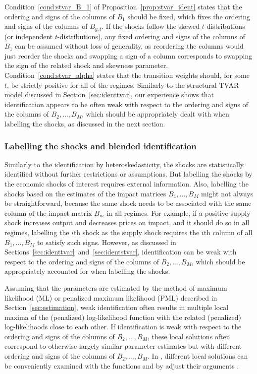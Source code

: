 \documentclass[nojss]{jss}
\begin{document}
Condition~\ref{cond:stvar_B_1} of Proposition~\ref{prop:stvar_ident} states that the ordering and signs of the columns of $B_1$ should be fixed, which fixes the ordering and signs of the columns of $B_{y,t}$. If the shocks follow the skewed $t$-distributions (or independent $t$-distributions), any fixed ordering and signs of the columns of $B_1$ can be assumed without loss of generality, as reordering the columns would just reorder the shocks and swapping a sign of a column corresponds to swapping the sign of the related shock and skewness parameter. Condition~\ref{cond:stvar_alpha} states that the transition weights should, for some $t$, be strictly positive for all of the regimes. Similarly to the structural TVAR model discussed in Section~\ref{sec:identtvar}, our experience shows that identification appears to be often weak with respect to the ordering and signs of the columns of $B_2,...,B_M$, which should be appropriately dealt with when labelling the shocks, as discussed in the next section.

\subsubsection{Labelling the shocks and blended identification}\label{sec:labellingshocks}

Similarly to the identification by heteroskedasticity, the shocks are statistically identified without further restrictions or assumptions. But labelling the shocks by the economic shocks of interest requires external information. Also, labelling the shocks based on the estimates of the impact matrices $B_1,...,B_M$ might not always be straightforward, because the same shock needs to be associated with the same column of the impact matrix $B_m$ in all regimes. For example, if a positive supply shock increases output and decreases prices on impact, and it should do so in all regimes, labelling the $i$th shock as the supply shock requires the $i$th column of all $B_1,...,B_M$ to satisfy such signs. However, as discussed in Sections~\ref{sec:identtvar}~and~\ref{sec:identstvar}, identification can be weak with respect to the ordering and signs of the columns of $B_2,...,B_M$, which should be appropriately accounted for when labelling the shocks.

Assuming that the parameters are estimated by the method of maximum likelihood (ML) or penalized maximum likelihood (PML) described in Section~\ref{sec:estimation}, weak identification often results in multiple local maxima of the (penalized) log-likelihood function with the related (penalized) log-likelihoods close to each other. If identification is weak with respect to the ordering and signs of the columns of $B_2,...,B_M$, these local solutions often correspond to otherwise largely similar parameter estimates but with different ordering and signs of the columns of $B_2,...,B_M$. In , different local solutions can be conveniently examined with the functions  and  by adjust their arguments .
\end{document}
